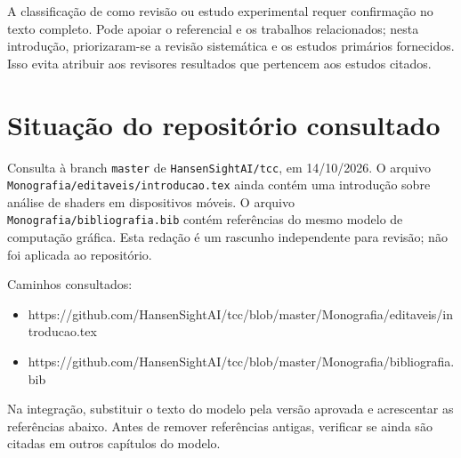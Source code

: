A classificação de  como revisão ou estudo experimental requer confirmação no texto completo. Pode apoiar o referencial e os trabalhos
relacionados; nesta introdução, priorizaram-se a revisão sistemática  e os estudos primários fornecidos. Isso evita atribuir aos
revisores resultados que pertencem aos estudos citados.

\section{Situação do repositório
consultado}\label{situauxe7uxe3o-do-reposituxf3rio-consultado}

Consulta à branch \texttt{master} de \texttt{HansenSightAI/tcc}, em
14/10/2026. O arquivo \texttt{Monografia/editaveis/introducao.tex} ainda
contém uma introdução sobre análise de shaders em dispositivos móveis. O
arquivo \texttt{Monografia/bibliografia.bib} contém referências do mesmo
modelo de computação gráfica. Esta redação é um rascunho independente
para revisão; não foi aplicada ao repositório.

Caminhos consultados:

\begin{itemize}
\tightlist
\item
  https://github.com/HansenSightAI/tcc/blob/master/Monografia/editaveis/introducao.tex
\item
  https://github.com/HansenSightAI/tcc/blob/master/Monografia/bibliografia.bib
\end{itemize}

Na integração, substituir o texto do modelo pela versão aprovada e
acrescentar as referências abaixo. Antes de remover referências antigas,
verificar se ainda são citadas em outros capítulos do modelo.


